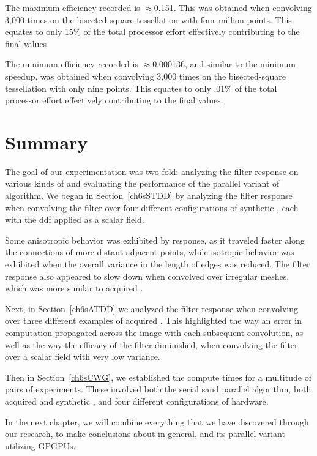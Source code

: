 The maximum efficiency recorded is $\approx$0.151. This was obtained when convolving  3,000 times on the bisected-square tessellation with four million points. This equates to only 15\% of the total processor effort effectively contributing to the final values.

The minimum efficiency recorded is $\approx$0.000136, and similar to the minimum speedup, was obtained when convolving  3,000 times on the bisected-square tessellation with only nine points. This equates to only .01\% of the total processor effort effectively contributing to the final values.

%
%
%
%
%
%
\clearpage
\section{Summary}
The goal of our experimentation was two-fold: analyzing the filter response on various kinds of \tdd{} and evaluating the performance of the parallel variant of  algorithm. We began in Section~\ref{ch6sSTDD} by analyzing the filter response when convolving the filter over four different configurations of synthetic \tdd{}, each with the \gls{ddf} applied as a scalar field.

Some anisotropic behavior was exhibited by  response, as it traveled faster along the connections of more distant adjacent points, while isotropic behavior was exhibited when the overall variance in the length of edges was reduced. The filter response also appeared to slow down when convolved over irregular meshes, which was more similar to acquired \tdd{}.

Next, in Section~\ref{ch6sATDD} we analyzed the filter response when convolving over three different examples of acquired \tdd{}. This highlighted the way an error in computation propagated across the image with each subsequent convolution, as well as the way the efficacy of the filter diminished, when convolving the filter over a scalar field with very low variance.

Then in Section~\ref{ch6sCWG}, we established the compute times for a multitude of pairs of experiments. These involved both the serial sand parallel algorithm, both acquired and synthetic \tdd{}, and four different configurations of hardware.

In the next chapter, we will combine everything that we have discovered through our research, to make conclusions about  in general, and its parallel variant utilizing \glspl{GPGPU}.
